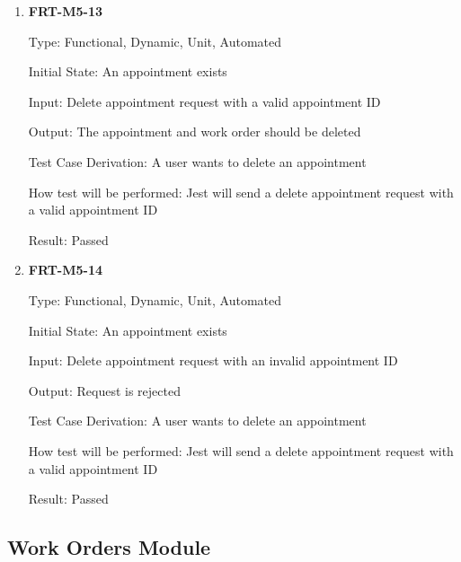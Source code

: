 \documentclass[12pt, titlepage]{article}
\begin{document}
\begin{enumerate}
	\item \textbf{FRT-M5-13}

	      Type: Functional, Dynamic, Unit, Automated

	      Initial State: An appointment exists

	      Input: Delete appointment request with a valid appointment ID

	      Output: The appointment and work order should be deleted

	      Test Case Derivation: A user wants to delete an appointment

	      How test will be performed: Jest will send a delete appointment request with a valid appointment ID

	      Result: Passed

	\item \textbf{FRT-M5-14}

	      Type: Functional, Dynamic, Unit, Automated

	      Initial State: An appointment exists

	      Input: Delete appointment request with an invalid appointment ID

	      Output: Request is rejected

	      Test Case Derivation: A user wants to delete an appointment

	      How test will be performed: Jest will send a delete appointment request with a valid appointment ID

	      Result: Passed

\end{enumerate}

\subsection{Work Orders Module}
\end{document}
